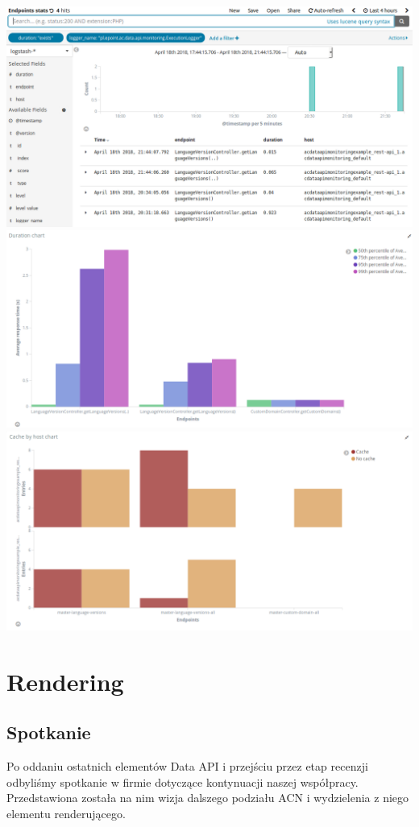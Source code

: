 \documentclass[licencjacka]{pracamgr}
\begin{document}
\includegraphics[scale=1]{images/kibana2.png}
\includegraphics[scale=1]{images/kibana3.png}
\includegraphics[scale=1]{images/kibana4.png}

\chapter{Rendering}

\section{Spotkanie}

Po oddaniu ostatnich elementów Data API i przejściu przez etap recenzji odbyliśmy spotkanie w firmie dotyczące kontynuacji naszej współpracy. Przedstawiona została na nim wizja dalszego podziału ACN i wydzielenia z niego elementu renderującego.
\end{document}
